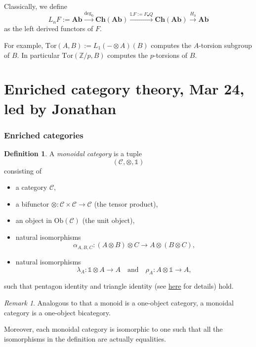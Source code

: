 \documentclass[11pt]{article}
\theoremstyle{definition}
\newtheorem{definition}[theorem]{Definition}
\theoremstyle{remark}
\newtheorem{remark}[theorem]{Remark}
\newcommand{\Ch}{\mathbf{Ch}}
\newcommand{\Ab}{\mathbf{Ab}}
\newcommand{\bbone}{\mathbb{1}}
\begin{document}
Classically, we define
$$ L_n F := \Ab \stackrel{\text{deg}_0}{\to} \Ch(\Ab) \stackrel{\mathbb L F := F_\bullet Q}{\longrightarrow} \Ch(\Ab) \stackrel{H_0}{\to} \Ab$$
as the left derived functors of $F$.

For example, $\text{Tor}(A,B) := L_1(- \otimes A)(B)$ computes the $A$-torsion subgroup of $B$.
In particular $\text{Tor}(\mathbb Z/p, B)$ computes the $p$-torsions of $B$.

\part{Enriched category theory, Mar 24, led by Jonathan}
\label{part-4}
\setcounter{section}{0}

\section{Enriched categories}

\begin{definition}
A \emph{monoidal category} is a tuple
\[
(\mathcal{C}, \otimes, \bbone)
\]
consisting of

\begin{itemize}
    \item a category $\mathcal{C}$,
    \item a bifunctor $\otimes : \mathcal{C} \times \mathcal{C} \to \mathcal{C}$ (the tensor product),
    \item an object in $\mathrm{Ob}(\mathcal{C})$ (the unit object),
    \item natural isomorphisms
    \[
    \alpha_{A,B,C} : (A \otimes B) \otimes C \to A \otimes (B \otimes C),
    \]
    \item natural isomorphisms
    \[
    \lambda_A : \bbone \otimes A \to A
    \quad \text{and} \quad
    \rho_A : A \otimes \bbone \to A,
    \]
\end{itemize}

such that pentagon identity and triangle identity (see \href{https://ncatlab.org/nlab/show/monoidal+category}{here} for details) hold.
\end{definition}

\begin{remark}
    Analogous to that a monoid is a one-object category, a monoidal category is a one-object bicategory.

    Moreover, each monoidal category is isomorphic to one such that all the isomorphisms in the definition are actually equalities.
\end{remark}
\end{document}
